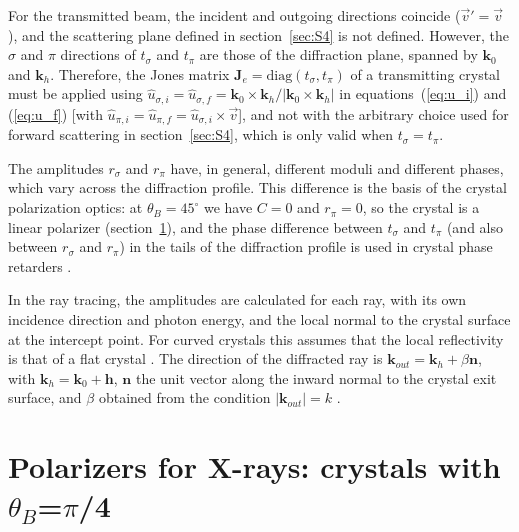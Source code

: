 \documentclass{iucr}
\begin{document}
For the transmitted beam, the incident and outgoing directions coincide ($\vec{v}'=\vec{v}$), and the scattering plane defined in section~\ref{sec:S4} is not defined. However, the $\sigma$ and $\pi$ directions of $t_\sigma$ and $t_\pi$ are those of the diffraction plane, spanned by $\mathbf{k}_0$ and $\mathbf{k}_h$. Therefore, the Jones matrix $\textbf{J}_e=\mathrm{diag}(t_\sigma,t_\pi)$ of a transmitting crystal must be applied using $\hat{u}_{\sigma,i}=\hat{u}_{\sigma,f}=\mathbf{k}_0\times\mathbf{k}_h/|\mathbf{k}_0\times\mathbf{k}_h|$ in equations~(\ref{eq:u_i}) and (\ref{eq:u_f}) [with $\hat{u}_{\pi,i}=\hat{u}_{\pi,f}=\hat{u}_{\sigma,i}\times\vec{v}$], and not with the arbitrary choice used for forward scattering in section~\ref{sec:S4}, which is only valid when $t_\sigma=t_\pi$.

The amplitudes $r_\sigma$ and $r_\pi$ have, in general, different moduli and different phases, which vary across the diffraction profile. This difference is the basis of the crystal polarization optics: at $\theta_B=45^\circ$ we have $C=0$ and $r_\pi=0$, so the crystal is a linear polarizer (section~\ref{sec:polarizers45degBenchmark}), and the phase difference between $t_\sigma$ and $t_\pi$ (and also between $r_\sigma$ and $r_\pi$) in the tails of the diffraction profile is used in crystal phase retarders \cite{PolarizationDraft}.

In the ray tracing, the amplitudes are calculated for each ray, with its own incidence direction and photon energy, and the local normal to the crystal surface at the intercept point. For curved crystals this assumes that the local reflectivity is that of a flat crystal \cite{Guigay2024}. The direction of the diffracted ray is $\mathbf{k}_{out}=\mathbf{k}_h+\beta\mathbf{n}$, with $\mathbf{k}_h=\mathbf{k}_0+\mathbf{h}$, $\mathbf{n}$ the unit vector along the inward normal to the crystal exit surface, and $\beta$ obtained from the condition $|\mathbf{k}_{out}|=k$ \cite{Guigay2024}.



\section{Polarizers for X-rays: crystals with $\theta_B$=$\pi$/4}\label{sec:polarizers45degBenchmark}
\end{document}
